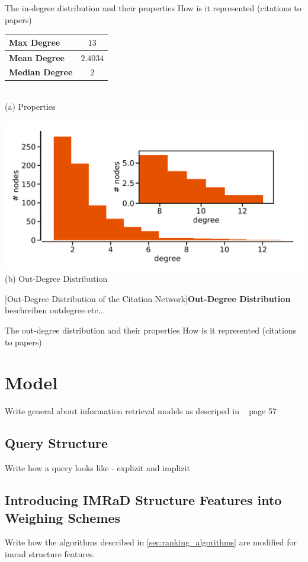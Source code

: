 The in-degree distribution and their properties How is it represented (citations to papers)

\begin{minipage}[t]{\textwidth}
  \begin{minipage}[b]{0.39\textwidth}
    \centering
    \begin{tabular}{ l c }
      \toprule
      \textbf{Max Degree}    & $13$     \\ \midrule
      \textbf{Mean Degree}   & $2.4034$ \\ \midrule
      \textbf{Median Degree} & $2$      \\
      \bottomrule
  \end{tabular} \\
  \vspace*{1cm}
  (a) Properties
\end{minipage}
\begin{minipage}[b]{0.59\textwidth}
  \centering
  \includegraphics[width=1.0\textwidth]{figures/out-degree_distribution} \\
  (b) Out-Degree Distribution
  \end{minipage}
  [Out-Degree Distribution of the Citation Network]{\textbf{Out-Degree Distribution} beschreiben outdegree etc...}
  \label{fig:indegree_distribution}
\end{minipage}

The out-degree distribution and their properties How is it represented (citations to papers)

\section{Model}
\label{sec:model}

Write general about information retrieval models as descriped in ~\cite{ModernInvormationRetrieval1999} page 57

\subsection{Query Structure}

Write how a query looks like - explizit and implizit

\subsection{Introducing IMRaD Structure Features into Weighing Schemes}

Write how the algorithms described in \cref{sec:ranking_algorithms} are modified for imrad structure features.
